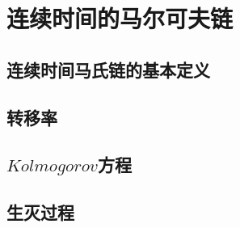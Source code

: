 \section{连续时间的马尔可夫链}
    \subsection{连续时间马氏链的基本定义}
    \subsection{转移率}
    \subsection{$Kolmogorov$方程}
    \subsection{生灭过程}